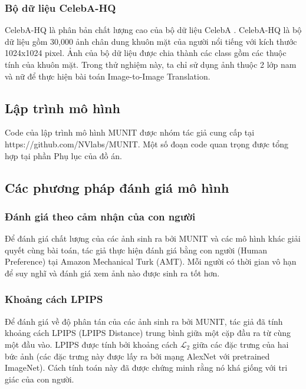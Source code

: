 {    \subsubsection{Bộ dữ liệu CelebA-HQ}
    CelebA-HQ là phân bản chất lượng cao của bộ dữ liệu CelebA \citep{celeba}. CelebA-HQ là bộ dữ liệu gồm 30,000 ảnh chân dung khuôn mặt của người nổi tiếng với kích thước 1024x1024 pixel. Ảnh của bộ dữ liệu được chia thành các class gồm các thuộc tính của khuôn mặt. Trong thử nghiệm này, ta chỉ sử dụng ảnh thuộc 2 lớp nam và nữ để thực hiện bài toán Image-to-Image Translation.
    
    \subsection{Lập trình mô hình}
    Code của lập trình mô hình MUNIT được nhóm tác giả cung cấp tại \\ https://github.com/NVlabs/MUNIT. Một số đoạn code quan trọng được tổng hợp tại phần Phụ lục của đồ án.
    
    \subsection{Các phương pháp đánh giá mô hình}
    \subsubsection{Đánh giá theo cảm nhận của con người}
    Để đánh giá chất lượng của các ảnh sinh ra bởi MUNIT và các mô hình khác giải quyết cùng bài toán, tác giả thực hiện đánh giá bằng con người (Human Preference) tại Amazon Mechanical Turk (AMT). Mỗi người có thời gian vô hạn để suy nghĩ và đánh giá xem ảnh nào được sinh ra tốt hơn.

    \subsubsection{Khoảng cách LPIPS}
    Để đánh giá về độ phân tán của các ảnh sinh ra bởi MUNIT, tác giả đã tính khoảng cách LPIPS (LPIPS Distance) trung bình giữa một cặp đầu ra từ cùng một đầu vào. LPIPS được tính bởi khoảng cách $\mathcal{L}_{2}$ giữa các đặc trưng của hai bức ảnh (các đặc trưng này được lấy ra bởi mạng AlexNet với pretrained ImageNet). Cách tính toán này đã được chứng minh rằng nó khá giống với tri giác của con người.

}
